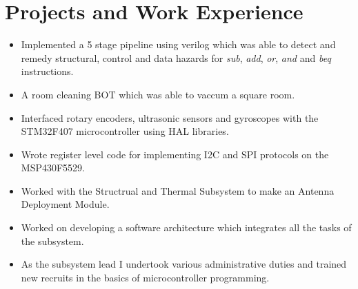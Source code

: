 \documentclass{resume}
\begin{document}
\section{Projects and Work Experience}
    \begin{itemize}\setlength{\itemsep}{0pt}\setlength{\parskip}{0pt}\vspace{-0.5em}
        \item Implemented a 5 stage pipeline using verilog which was able to detect and remedy structural, control and data hazards for \emph{sub}, \emph{add}, \emph{or}, \emph{and} and \emph{beq} instructions.
    \end{itemize}
\begin{itemize}\setlength{\itemsep}{0pt}\setlength{\parskip}{0pt}\vspace{-0.5em}
    \item A room cleaning BOT which was able to vaccum a square room.
    \item Interfaced rotary encoders, ultrasonic sensors and gyroscopes with the STM32F407 microcontroller using HAL libraries.
\end{itemize}
\begin{itemize}\setlength{\itemsep}{0pt}\setlength{\parskip}{0pt}\vspace{-0.5em}
    \item Wrote register level code for implementing I2C and SPI protocols on the MSP430F5529.
    \item Worked with the Structrual and Thermal Subsystem to make an Antenna Deployment Module.
    \item Worked on developing a software architecture which integrates all the tasks of the subsystem.
    \item As the subsystem lead I undertook various administrative duties and trained new recruits in the basics of microcontroller programming.
\end{itemize}

\end{document}
